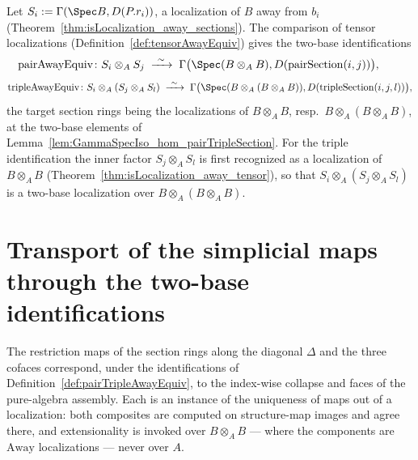 \begin{definition}
  \label{def:pairTripleAwayEquiv}
  \leanok
  Let \(S_i := \Gamma(\Spec B, D(P.r_i))\), a localization of \(B\) away from \(b_i\)
  (Theorem~\ref{thm:isLocalization_away_sections}). The comparison of tensor localizations
  (Definition~\ref{def:tensorAwayEquiv}) gives the two-base identifications
  \[
    \mathrm{pairAwayEquiv} \colon S_i \otimes_A S_j \;\xrightarrow{\ \sim\ }\;
      \Gamma\bigl(\Spec(B \otimes_A B), D(\mathrm{pairSection}(i, j))\bigr), \qquad
  \]
  \[
    \mathrm{tripleAwayEquiv} \colon S_i \otimes_A (S_j \otimes_A S_l) \;\xrightarrow{\ \sim\ }\;
      \Gamma\bigl(\Spec(B \otimes_A (B \otimes_A B)), D(\mathrm{tripleSection}(i, j, l))\bigr) ,
  \]
  the target section rings being the localizations of \(B \otimes_A B\), resp.\
  \(B \otimes_A (B \otimes_A B)\), at the two-base elements of
  Lemma~\ref{lem:GammaSpecIso_hom_pairTripleSection}. For the triple identification the inner
  factor \(S_j \otimes_A S_l\) is first recognized as a localization of \(B \otimes_A B\)
  (Theorem~\ref{thm:isLocalization_away_tensor}), so that
  \(S_i \otimes_A (S_j \otimes_A S_l)\) is a two-base localization over
  \(B \otimes_A (B \otimes_A B)\).
\end{definition}

\section{Transport of the simplicial maps through the two-base identifications}
\label{sec:witnessTransport}

The restriction maps of the section rings along the diagonal \(\Delta\) and the three cofaces
correspond, under the identifications of Definition~\ref{def:pairTripleAwayEquiv}, to the
index-wise collapse and faces of the pure-algebra assembly. Each is an instance of the
uniqueness of maps out of a localization: both composites are computed on structure-map
images and agree there, and extensionality is invoked over \(B \otimes_A B\) — where the
components are \(\mathrm{Away}\) localizations — never over \(A\).

